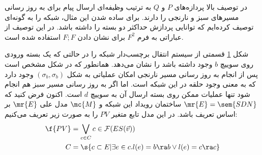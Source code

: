 در توصیف بالا پردازه‌های
$P$
و
$Q$
به ترتیب وظیفه‌ای ارسال پیام برای به روز رسانی مسیر‌های سبز و نارنجی را دارند.
برای ساده شدن این مثال، شبکه را به گونه‌ای توصیف کرده‌ایم که توانایی پردازش حداکثر دو بسته را داشته باشد.
در این توصیف از عباراتی به فرم
$F^2$
برای نشان دادن 
$F;F$
استفاده شده است.
\begin{figure}
    \centering
    \caption{}
    \label{fig:congestion:lts}
\end{figure}
شکل
\ref{fig:congestion:lts}
قسمتی از سیستم انتقال برچسب‌دار شبکه را در حالتی که یک بسته ورودی روی سوییچ
$b$
وجود داشته باشد را نشان می‌دهد.
همانطور که در شکل مشخص است پس از انجام به روز رسانی مسیر نارنجی امکان عملیاتی به شکل
$(\sigma_b,\sigma_b)$
وجود دارد که به معنی وجود حلقه در این شبکه است.
اما اگر به روز رسانی مسیر سبز هم انجام شود تنها عملیات ممکن روی بسته ارسال آن به سوییچ
$d$
است.
اکنون فرض کنید که
$\mr{E} = \sem{SDN}$
ساختمان رویداد این شبکه و
$\mc{M}$
مدل علی
$\mr{E}$
بر اساس تعریف
باشد.
در این مدل تابع متغیر
$PV$
را به صورت زیر تعریف می‌کنیم:
\begin{align*}
    \f{PV} & = \bigvee_{c \in C} c \in \mathcal{F}(ES(\vec v)) \\
    C      & = \s{c \subset E | \exists e \in c.
        l(e) = b\ra b \vee l(e) = c\ra c }
\end{align*}
